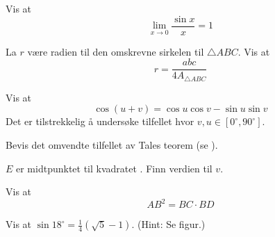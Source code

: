 Vis at 
\[\lim\limits_{x\to0} \frac{\sin x}{x}=1 \]

La $ r $ være radien til den omskrevne sirkelen til $ \triangle ABC $. Vis at
\[ r=\frac{abc}{4A_{\triangle ABC}} \]

Vis at
\[ \cos(u+v)= \cos u\cos v-\sin u \sin v \]
Det er tilstrekkelig å undersøke tilfellet hvor $ v,u \in [0^\circ, 90^\circ] $.

Bevis det omvendte tilfellet av Tales teorem (se  ).


$ E $ er midtpunktet til kvadratet . Finn verdien til $ v $.

Vis at
\[ AB^2 = BC\cdot BD \]

Vis at $ \sin 18^\circ=\frac{1}{4}(\sqrt{5}-1) $. (Hint: Se figur.)






